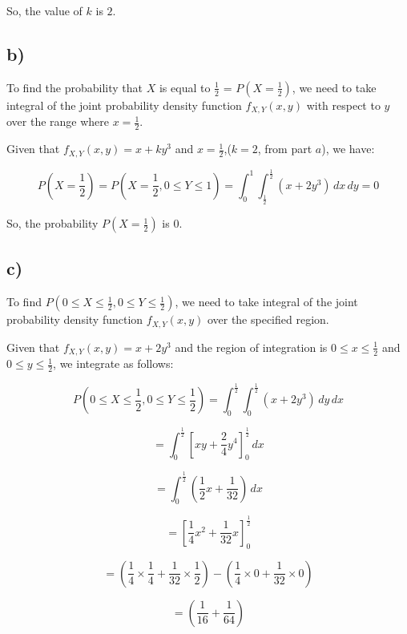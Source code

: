 \documentclass[12pt]{article}
\begin{document}
So, the value of $k$ is $2$.

\subsection*{b)}

To find the probability that \( X \) is equal to \( \frac{1}{2} \) = \( P(X = \frac{1}{2}) \), we need to take integral of the joint probability density function \( f_{X,Y}(x, y) \) with respect to \( y \) over the range where \( x = \frac{1}{2} \).

Given that \( f_{X,Y}(x, y) = x + ky^3 \) and \( x = \frac{1}{2} \),(\( k = 2 \), from part $a$), we have:

\begin{equation}
P(X = \frac{1}{2}) = P\left(X = \frac{1}{2}, 0 \leq Y \leq  1\right) = \int_{0}^{1} \int_{\frac{1}{2}}^{\frac{1}{2}} (x + 2y^3) \, dx \, dy = 0
\end{equation}



So, the probability \( P(X = \frac{1}{2}) \) is 0.

\subsection*{c)} 

To find \( P(0 \leq X \leq \frac{1}{2}, 0 \leq Y \leq \frac{1}{2}) \), we need to take integral of the joint probability density function \( f_{X,Y}(x, y) \) over the specified region.

Given that \( f_{X,Y}(x, y) = x + 2y^3 \) and the region of integration is \( 0 \leq x \leq \frac{1}{2} \) and \( 0 \leq y \leq \frac{1}{2} \), we integrate as follows:

\[
P(0 \leq X \leq \frac{1}{2}, 0 \leq Y \leq \frac{1}{2}) = \int_{0}^{\frac{1}{2}} \int_{0}^{\frac{1}{2}} (x + 2y^3) \, dy \, dx
\]

\[
= \int_{0}^{\frac{1}{2}} \left[ xy + \frac{2}{4}y^4 \right]_{0}^{\frac{1}{2}} \, dx
\]

\[
= \int_{0}^{\frac{1}{2}} \left( \frac{1}{2}x + \frac{1}{32} \right) \, dx
\]

\[
= \left[ \frac{1}{4}x^2 + \frac{1}{32}x \right]_{0}^{\frac{1}{2}}
\]

\[
= \left( \frac{1}{4} \times \frac{1}{4} + \frac{1}{32} \times \frac{1}{2} \right) - \left( \frac{1}{4} \times 0 + \frac{1}{32} \times 0 \right)
\]

\[
= \left( \frac{1}{16} + \frac{1}{64} \right)
\]
\end{document}
